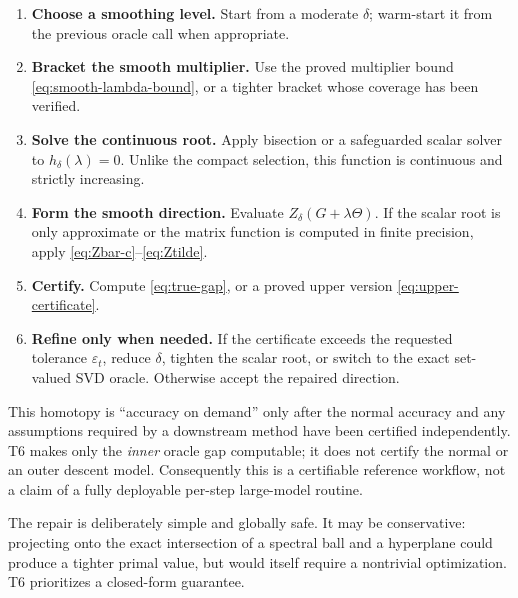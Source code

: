 \begin{enumerate}
  \item \textbf{Choose a smoothing level.}
        Start from a moderate \(\delta\); warm-start it from the previous
        oracle call when appropriate.
  \item \textbf{Bracket the smooth multiplier.}
        Use the proved multiplier bound
        \eqref{eq:smooth-lambda-bound}, or a tighter bracket whose coverage has
        been verified.
  \item \textbf{Solve the continuous root.}
        Apply bisection or a safeguarded scalar solver to
        \(h_\delta(\lambda)=0\).  Unlike the compact selection, this function
        is continuous and strictly increasing.
  \item \textbf{Form the smooth direction.}
        Evaluate \(Z_\delta(G+\lambda\Theta)\).  If the scalar root is only
        approximate or the matrix function is computed in finite precision,
        apply \eqref{eq:Zbar-c}--\eqref{eq:Ztilde}.
  \item \textbf{Certify.}
        Compute \eqref{eq:true-gap}, or a proved upper version
        \eqref{eq:upper-certificate}.
  \item \textbf{Refine only when needed.}
        If the certificate exceeds the requested tolerance \(\varepsilon_t\), reduce
        \(\delta\), tighten the scalar root, or switch to the exact
        set-valued SVD oracle.  Otherwise accept the repaired direction.
\end{enumerate}

This homotopy is ``accuracy on demand'' only after the normal accuracy and any
assumptions required by a downstream method have been certified independently.
T6 makes only the \emph{inner} oracle gap computable; it does not certify the
normal or an outer descent model.
Consequently this is a certifiable reference workflow, not a claim of a
fully deployable per-step large-model routine.

\begin{remark}[Conservatism]
The repair is deliberately simple and globally safe.  It may be conservative:
projecting onto the exact intersection of a spectral ball and a hyperplane
could produce a tighter primal value, but would itself require a nontrivial
optimization.  T6 prioritizes a closed-form guarantee.
\end{remark}
